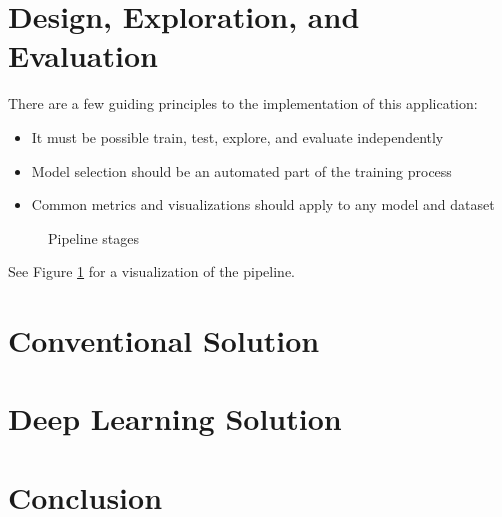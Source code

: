 \documentclass{article}
\begin{document}
\section{Design, Exploration, and Evaluation}

There are a few guiding principles to the implementation of this application:

\begin{itemize}
\item It must be possible train, test, explore, and evaluate independently
\item Model selection should be an automated part of the training process
\item Common metrics and visualizations should apply to any model and dataset
\end{itemize}

\begin{figure}[htbp]
  \centering
  
  \caption{Pipeline stages}
  \label{fig:pipeline}
\end{figure}

See Figure \ref{fig:pipeline} for a visualization of the pipeline.

\section{Conventional Solution}

\section{Deep Learning Solution}

\section{Conclusion}

\printbibliography[heading=bibintoc,title={References}]
\end{document}
